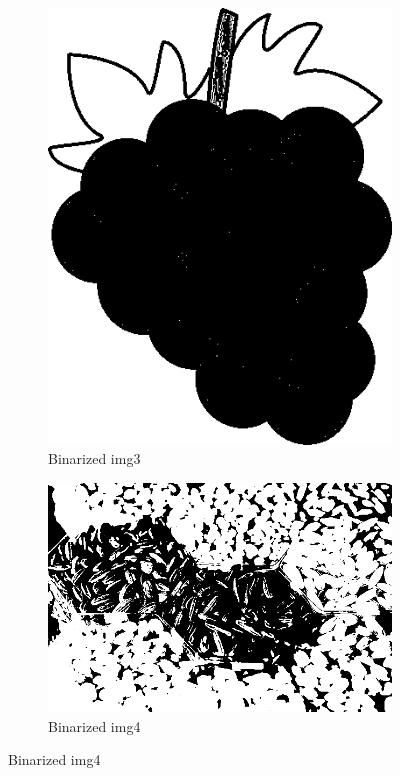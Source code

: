 \documentclass[14pt]{article}
\begin{document}
\begin{figure}[hbt!]
	\centering
	\begin{subfigure}[b]{0.4\linewidth}
		\includegraphics[width=\linewidth]{img3bi.png}
		\caption{Binarized img3}
	\end{subfigure}
	\begin{subfigure}[b]{0.4\linewidth}
		\includegraphics[width=\linewidth]{img4bi.png}
		\caption{Binarized img4}
	\end{subfigure}
\end{figure}
\end{document}
